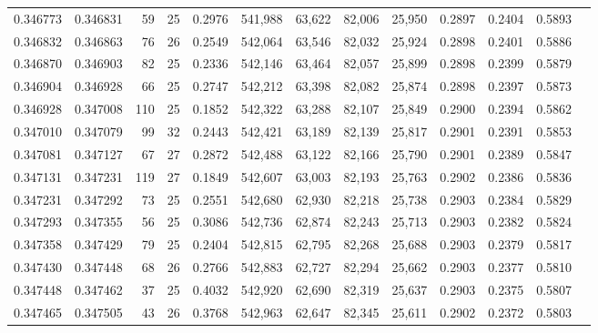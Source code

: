 \begin{tabular}{rrrrrrrrrrrrr}
0.346773 & 0.346831 &    59 &  25 &                                     0.2976 & 541,988 &  63,622 &  82,006 &  25,950 & 0.2897 & 0.2404 & 0.5893 \\
0.346832 & 0.346863 &    76 &  26 &                                     0.2549 & 542,064 &  63,546 &  82,032 &  25,924 & 0.2898 & 0.2401 & 0.5886 \\
0.346870 & 0.346903 &    82 &  25 &                                     0.2336 & 542,146 &  63,464 &  82,057 &  25,899 & 0.2898 & 0.2399 & 0.5879 \\
0.346904 & 0.346928 &    66 &  25 &                                     0.2747 & 542,212 &  63,398 &  82,082 &  25,874 & 0.2898 & 0.2397 & 0.5873 \\
0.346928 & 0.347008 &   110 &  25 &                                     0.1852 & 542,322 &  63,288 &  82,107 &  25,849 & 0.2900 & 0.2394 & 0.5862 \\
0.347010 & 0.347079 &    99 &  32 &                                     0.2443 & 542,421 &  63,189 &  82,139 &  25,817 & 0.2901 & 0.2391 & 0.5853 \\
0.347081 & 0.347127 &    67 &  27 &                                     0.2872 & 542,488 &  63,122 &  82,166 &  25,790 & 0.2901 & 0.2389 & 0.5847 \\
0.347131 & 0.347231 &   119 &  27 &                                     0.1849 & 542,607 &  63,003 &  82,193 &  25,763 & 0.2902 & 0.2386 & 0.5836 \\
0.347231 & 0.347292 &    73 &  25 &                                     0.2551 & 542,680 &  62,930 &  82,218 &  25,738 & 0.2903 & 0.2384 & 0.5829 \\
0.347293 & 0.347355 &    56 &  25 &                                     0.3086 & 542,736 &  62,874 &  82,243 &  25,713 & 0.2903 & 0.2382 & 0.5824 \\
0.347358 & 0.347429 &    79 &  25 &                                     0.2404 & 542,815 &  62,795 &  82,268 &  25,688 & 0.2903 & 0.2379 & 0.5817 \\
0.347430 & 0.347448 &    68 &  26 &                                     0.2766 & 542,883 &  62,727 &  82,294 &  25,662 & 0.2903 & 0.2377 & 0.5810 \\
0.347448 & 0.347462 &    37 &  25 &                                     0.4032 & 542,920 &  62,690 &  82,319 &  25,637 & 0.2903 & 0.2375 & 0.5807 \\
0.347465 & 0.347505 &    43 &  26 &                                     0.3768 & 542,963 &  62,647 &  82,345 &  25,611 & 0.2902 & 0.2372 & 0.5803 \\

\end{tabular}
